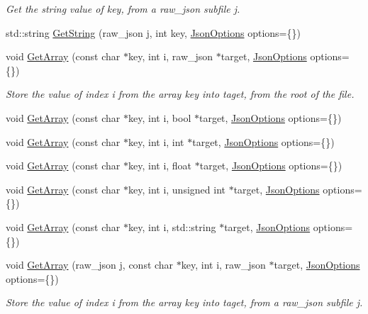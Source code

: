 \begin{DoxyCompactItemize}
\begin{DoxyCompactList}\small\item\em Get the string value of {\itshape key}, from a raw\+\_\+json subfile {\itshape j}. \end{DoxyCompactList}\item 
std\+::string \hyperlink{classTarbora_1_1Json_a3dc165dd8a91c9198fe436106c0b8c1d}{Get\+String} (raw\+\_\+json j, int key, \hyperlink{structTarbora_1_1JsonOptions}{Json\+Options} options=\{\})
\item 
void \hyperlink{classTarbora_1_1Json_ae3f68dde4705eb2c530e0ec51e2e05c5}{Get\+Array} (const char $\ast$key, int i, raw\+\_\+json $\ast$target, \hyperlink{structTarbora_1_1JsonOptions}{Json\+Options} options=\{\})
\begin{DoxyCompactList}\small\item\em Store the value of index {\itshape i} from the array {\itshape key} into {\itshape taget}, from the root of the file. \end{DoxyCompactList}\item 
void \hyperlink{classTarbora_1_1Json_a8e4641817f1cff98894b789fd0f2ef70}{Get\+Array} (const char $\ast$key, int i, bool $\ast$target, \hyperlink{structTarbora_1_1JsonOptions}{Json\+Options} options=\{\})
\item 
void \hyperlink{classTarbora_1_1Json_a707a924f561d6cdc8bf4ea1c78c8ed6b}{Get\+Array} (const char $\ast$key, int i, int $\ast$target, \hyperlink{structTarbora_1_1JsonOptions}{Json\+Options} options=\{\})
\item 
void \hyperlink{classTarbora_1_1Json_acac71de3b15d5ed9e9b8116900cef66b}{Get\+Array} (const char $\ast$key, int i, float $\ast$target, \hyperlink{structTarbora_1_1JsonOptions}{Json\+Options} options=\{\})
\item 
void \hyperlink{classTarbora_1_1Json_aad0a63e46f3911c3ec985fb1369adc45}{Get\+Array} (const char $\ast$key, int i, unsigned int $\ast$target, \hyperlink{structTarbora_1_1JsonOptions}{Json\+Options} options=\{\})
\item 
void \hyperlink{classTarbora_1_1Json_a28bd88966a480f75c9e115144af4c57f}{Get\+Array} (const char $\ast$key, int i, std\+::string $\ast$target, \hyperlink{structTarbora_1_1JsonOptions}{Json\+Options} options=\{\})
\item 
void \hyperlink{classTarbora_1_1Json_ad14021bb52b351d19b03089267be9766}{Get\+Array} (raw\+\_\+json j, const char $\ast$key, int i, raw\+\_\+json $\ast$target, \hyperlink{structTarbora_1_1JsonOptions}{Json\+Options} options=\{\})
\begin{DoxyCompactList}\small\item\em Store the value of index {\itshape i} from the array {\itshape key} into {\itshape taget}, from a raw\+\_\+json subfile {\itshape j}. \end{DoxyCompactList}\item 

\end{DoxyCompactItemize}
